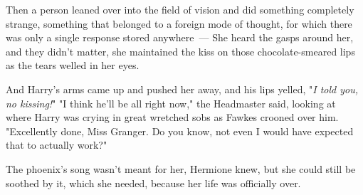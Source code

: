 Then a person leaned over into the field of vision and did something completely
strange, something that belonged to a foreign mode of thought, for which there
was only a single response stored anywhere~---
\sbreak
She heard the gasps around her, and they didn't matter, she maintained the kiss
on those chocolate-smeared lips as the tears welled in her eyes.

And Harry's arms came up and pushed her away, and his lips yelled, "\emph{I
told you, no kissing!}"
\sbreak
"I think he'll be all right now," the Headmaster said, looking at where Harry
was crying in great wretched sobs as Fawkes crooned over him. "Excellently
done, Miss Granger. Do you know, not even I would have expected that to
actually work?"

The phoenix's song wasn't meant for her, Hermione knew, but she could still be
soothed by it, which she needed, because her life was officially over.
